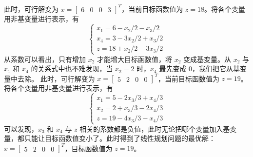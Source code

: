 此时，可行解变为 $x = \begin{bmatrix}6 & 0 & 0 & 3\end{bmatrix}^T$，当前目标函数值为 $z = 18$。将各个变量用非基变量进行表示，有
$$
\begin{cases}
x_1 = 6 - x_2/2 - x_3/2 \\ 
x_4 = 3 - 3x_2/2 + x_3/2 \\ 
z = 18 + x_2/2 - 3x_3/2
\end{cases}
$$
从系数可以看出，只有增加 $x_2$ 才能增大目标函数值，将 $x_2$ 变成基变量。从 $x_2$ 与 $x_1$ 和 $x_4$ 的关系式中也不难发现，当 $x_2 = 2$ 时，$x_4$ 最先变成 0，我们把它从基变量中去除。
此时，可行解变为 $x = \begin{bmatrix} 5 & 2 & 0 & 0 \end{bmatrix}^T$，当前目标函数值为 $z = 19$。将各个变量用非基变量进行表示，有 
$$
\begin{cases}
x_1 = 5 - 2x_3/3 + x_4/3 \\ 
x_2 = 2 + x_3/3 - 2x_4/3 \\ 
z = 19 - 4x_3/3 - x_4/3
\end{cases}
$$
可以发现，$x_3$ 和 $x_4$ 与 $z$ 相关的系数都是负值，此时无论把哪个变量加入基变量，都只能让目标函数值变小了。此时得到了线性规划问题的最优解：$x = \begin{bmatrix} 5 & 2 & 0 & 0 \end{bmatrix}^T$，目标函数值为 $z = 19$。

